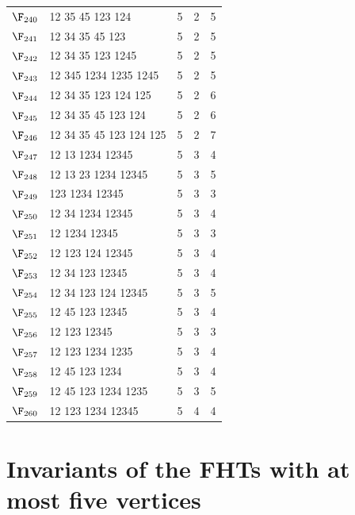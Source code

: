 {\begin{longtable}{c p{7cm} c c c}
$\F_{240}$ & 12 35 45 123 124 & 5 & 2 & 5 \\
$\F_{241}$ & 12 34 35 45 123 & 5 & 2 & 5 \\
$\F_{242}$ & 12 34 35 123 1245 & 5 & 2 & 5 \\
$\F_{243}$ & 12 345 1234 1235 1245 & 5 & 2 & 5 \\
$\F_{244}$ & 12 34 35 123 124 125 & 5 & 2 & 6 \\
$\F_{245}$ & 12 34 35 45 123 124 & 5 & 2 & 6 \\
$\F_{246}$ & 12 34 35 45 123 124 125 & 5 & 2 & 7 \\
\midrule
$\F_{247}$ & 12 13 1234 12345 & 5 & 3 & 4 \\
$\F_{248}$ & 12 13 23 1234 12345 & 5 & 3 & 5 \\
$\F_{249}$ & 123 1234 12345 & 5 & 3 & 3 \\
$\F_{250}$ & 12 34 1234 12345 & 5 & 3 & 4 \\
$\F_{251}$ & 12 1234 12345 & 5 & 3 & 3 \\
$\F_{252}$ & 12 123 124 12345 & 5 & 3 & 4 \\
$\F_{253}$ & 12 34 123 12345 & 5 & 3 & 4 \\
$\F_{254}$ & 12 34 123 124 12345 & 5 & 3 & 5 \\
$\F_{255}$ & 12 45 123 12345 & 5 & 3 & 4 \\
$\F_{256}$ & 12 123 12345 & 5 & 3 & 3 \\
$\F_{257}$ & 12 123 1234 1235 & 5 & 3 & 4 \\
$\F_{258}$ & 12 45 123 1234 & 5 & 3 & 4 \\
$\F_{259}$ & 12 45 123 1234 1235 & 5 & 3 & 5 \\
\midrule
$\F_{260}$ & 12 123 1234 12345 & 5 & 4 & 4 \\
\bottomrule
\end{longtable}}


\newpage
\section{Invariants of the FHTs with at most five vertices}\label{sec:annex}

